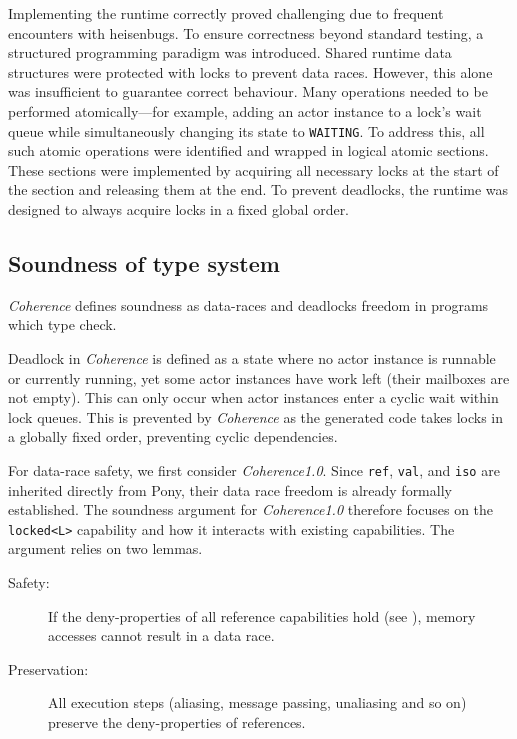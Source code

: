 Implementing the runtime correctly proved challenging due to frequent encounters with heisenbugs. To ensure correctness beyond standard testing, a structured programming paradigm was introduced. Shared runtime data structures were protected with locks to prevent data races. However, this alone was insufficient to guarantee correct behaviour.  Many operations needed to be performed atomically---for example, adding an actor instance to a lock's wait queue while simultaneously changing its state to \texttt{WAITING}. To address this, all such atomic operations were identified and wrapped in logical atomic sections. These sections were implemented by acquiring all necessary locks at the start of the section and releasing them at the end. To prevent deadlocks, the runtime was designed to always acquire locks in a fixed global order. %


\subsection{Soundness of type system} \label{sec:type_system_soundness}
\textit{Coherence} defines soundness as data-races and deadlocks freedom in programs which type check.

Deadlock in \textit{Coherence} is defined as a state where no actor instance is runnable or currently running, yet some actor instances have work left (their mailboxes are not empty). This can only occur when actor instances enter a cyclic wait within lock queues. This is prevented by \textit{Coherence} as the generated code takes locks in a globally fixed order, preventing cyclic dependencies. 

For data-race safety, we first consider \textit{Coherence1.0}. Since \texttt{ref}, \texttt{val}, and \texttt{iso} are inherited directly from Pony, their data race freedom is already formally established\cite{pony_language}. The soundness argument for \textit{Coherence1.0} therefore focuses on the \texttt{locked<L>} capability and how it interacts with existing capabilities. The argument relies on two lemmas. 

\begin{description}
  \item[Safety:] If the deny-properties of all reference capabilities hold (see ), memory accesses cannot result in a data race. 
  \item[Preservation:] All execution steps (aliasing, message passing, unaliasing and so on) preserve the deny-properties of references.
\end{description}

